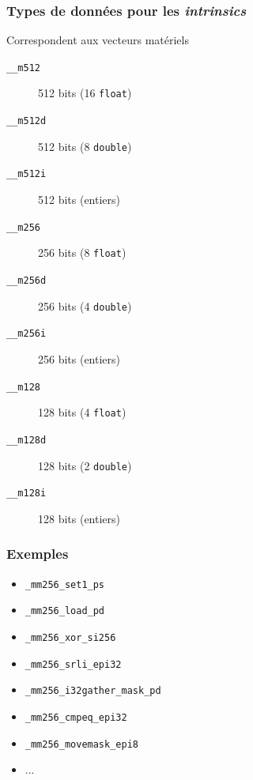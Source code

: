 \documentclass[xcolor={x11names,svgnames}]{beamer}
\begin{document}

\begin{frame}[fragile=singleslide]
  \frametitle{Types de données pour les \emph{intrinsics}}

\begin{block}{Correspondent aux \og vecteurs\fg{} matériels}
  
  \begin{description}
\item[\texttt{\_\_m512}] 512 bits (16 \texttt{float})
\item[\texttt{\_\_m512d}] 512 bits (8 \texttt{double})
\item[\texttt{\_\_m512i}] 512 bits (entiers)

  \item[\texttt{\_\_m256}] 256 bits (8 \texttt{float})
\item[\texttt{\_\_m256d}] 256 bits (4 \texttt{double})
\item[\texttt{\_\_m256i}] 256 bits (entiers)

\item[\texttt{\_\_m128}] 128 bits (4 \texttt{float})
\item[\texttt{\_\_m128d}] 128 bits (2 \texttt{double})
\item[\texttt{\_\_m128i}] 128 bits (entiers)
\end{description}
\end{block}
\end{frame}


\begin{frame}[fragile=singleslide]
  \frametitle{Exemples}

  \begin{itemize}
  \item \texttt{_mm256_set1_ps}
  \item \texttt{_mm256_load_pd}
  \item \texttt{_mm256_xor_si256}
  \item \texttt{_mm256_srli_epi32}
  \item \texttt{_mm256_i32gather_mask_pd}
  \item \texttt{_mm256_cmpeq_epi32}
  \item \texttt{_mm256_movemask_epi8}
  \item ...
  \end{itemize}
\end{frame}
\end{document}
